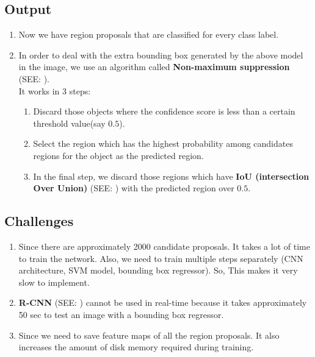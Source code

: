 \subsection*{Output}
\begin{enumerate}
    \item Now we have region proposals that are classified for every class label. 
    
    \item In order to deal with the extra bounding box generated by the above model in the image, we use an algorithm called \textbf{Non-maximum suppression} (SEE: ).\\
    It works in 3 steps:
    \begin{enumerate}
        \item Discard those objects where the confidence score is less than a certain threshold value(say $0.5$).

        \item Select the region which has the highest probability among candidates regions for the object as the predicted region.

        \item In the final step, we discard those regions which have \textbf{IoU (intersection Over Union)} (SEE: ) with the predicted region over $0.5$.

    \end{enumerate}
\end{enumerate}

\subsection*{Challenges}
\begin{enumerate}
    \item Since there are approximately 2000 candidate proposals. It takes a lot of time to train the network. Also, we need to train multiple steps separately (CNN architecture, SVM model, bounding box regressor). So, This makes it very slow to implement.

    \item \textbf{R-CNN} (SEE: ) cannot be used in real-time because it takes approximately 50 sec to test an image with a bounding box regressor.

    \item Since we need to save feature maps of all the region proposals. It also increases the amount of disk memory required during training.
\end{enumerate}











